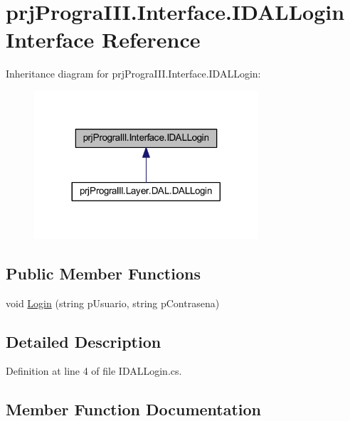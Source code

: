 \hypertarget{interfaceprj_progra_i_i_i_1_1_interface_1_1_i_d_a_l_login}{}\section{prj\+Progra\+I\+I\+I.\+Interface.\+I\+D\+A\+L\+Login Interface Reference}
\label{interfaceprj_progra_i_i_i_1_1_interface_1_1_i_d_a_l_login}


Inheritance diagram for prj\+Progra\+I\+I\+I.\+Interface.\+I\+D\+A\+L\+Login\+:
\nopagebreak
\begin{figure}[H]
\begin{center}
\leavevmode
\includegraphics[width=236pt]{interfaceprj_progra_i_i_i_1_1_interface_1_1_i_d_a_l_login__inherit__graph}
\end{center}
\end{figure}
\subsection*{Public Member Functions}
\begin{DoxyCompactItemize}
\item 
void \hyperlink{interfaceprj_progra_i_i_i_1_1_interface_1_1_i_d_a_l_login_a90f2596282cc596e630bd6ec13b3f245}{Login} (string p\+Usuario, string p\+Contrasena)
\end{DoxyCompactItemize}


\subsection{Detailed Description}


Definition at line 4 of file I\+D\+A\+L\+Login.\+cs.



\subsection{Member Function Documentation}
\hypertarget{interfaceprj_progra_i_i_i_1_1_interface_1_1_i_d_a_l_login_a90f2596282cc596e630bd6ec13b3f245}{}\label{interfaceprj_progra_i_i_i_1_1_interface_1_1_i_d_a_l_login_a90f2596282cc596e630bd6ec13b3f245} 
